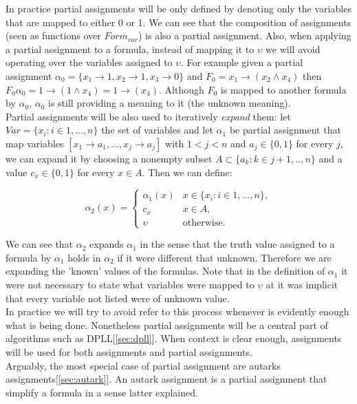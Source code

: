 In practice partial assignments will be only defined by denoting only the variables that are mapped to either 0 or 1. We can see that the composition of assignments (seen as functions over $Form_{var}$) is also a partial assignment. Also, when applying a partial assignment to a formula, instead of mapping it to $\upsilon$ we will avoid operating over the variables assigned to $\upsilon$. For example given a partial assignment $\alpha_0 = \{x_1 \to 1, x_2\to 1, x_3 \to 0\}$ and $F_0=x_1\to (x_2\wedge x_4)$ then  $F_0\alpha_0=1 \to (1\wedge x_4)= 1 \to (x_4)$. Although $F_0$ is mapped to another formula by $\alpha_0$, $\alpha_0$ is still providing a meaning to it (the unknown meaning). \\



Partial assignments will be also used to iteratively \emph{expand} them: let $Var= \{x_i:i\in 1,...,n\}$ the set of variables and let $\alpha_1$ be partial assignment that map variables $[x_1\to a_1,...,x_j\to a_j]$ with $1<j<n$ and $a_j\in\{0,1\}$ for every $j$, we can expand it by choosing a nonempty subset  $A\subset\{a_k: k\in j+1,..,n\}$ and a value $c_x \in \{0,1\}$ for every $x\in A$. Then we can define:

$$
\alpha_2(x)=
\begin{cases}
  \alpha_1(x) & x \in \{x_i : i \in 1,...,n\},\\
  c_x & x\in A, \\
  \upsilon & \text{otherwise}.
\end{cases}
$$

We can see that $\alpha_2$ expands $\alpha_1$ in the sense that the truth value assigned to a formula by $\alpha_1$ holds in $\alpha_2$ if it were different that unknown. Therefore we are expanding the 'known' values of the formulas. Note that in the definition of $\alpha_1$ it were not necessary to state what variables were mapped to $\upsilon$ at it was implicit that every variable not listed were of unknown  value.\\

In practice we will try to avoid refer to this process whenever is evidently enough what is being done. Nonetheless partial assignments will be a central part of algorithms such as DPLL[\ref{sec:dpll}]. When context is clear enough, assignments will be used for both assignments and partial assignments.\\

Arguably, the most special case of partial assignment are autarks assignments[\ref{sec:autark}]. An autark assignment is a partial assignment that simplify a formula in a sense latter explained.\\

